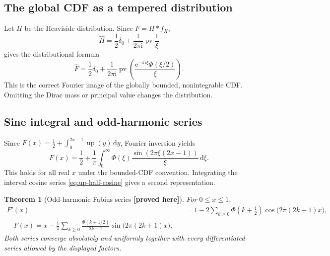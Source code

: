 \documentclass[11pt,oneside]{article}
\newtheorem{theorem}{Theorem}[section]
\theoremstyle{definition}
\theoremstyle{remark}
\newcommand{\Up}{\operatorname{up}}
\newcommand{\e}{\mathrm e}
\newcommand{\ii}{\mathrm i}
\newcommand{\dd}{\,\mathrm d}
\newcommand{\pv}{\operatorname{pv}}
\newcommand{\New}{\textcolor{amber}{\textbf{[proved here]}}}
\begin{document}
\subsection{The global CDF as a tempered distribution}

Let $H$ be the Heaviside distribution.  Since $F=H\ast f_X$,
\begin{equation}
 \widehat H=\frac12\delta_0+\frac{1}{2\pi\ii}\pv\frac1\xi
\end{equation}
gives the distributional formula
\begin{equation}
 \boxed{\quad
 \widehat F
 =\frac12\delta_0+
 \frac{1}{2\pi\ii}\pv\left(
 \frac{\e^{-\pi\ii\xi}\Phi(\xi/2)}{\xi}
 \right).
 \quad}                                                  \label{eq:F-distribution-transform}
\end{equation}
This is the correct Fourier image of the globally bounded, nonintegrable CDF.  Omitting the
Dirac mass or principal value changes the distribution.

\subsection{Sine integral and odd-harmonic series}

Since $F(x)=\tfrac12+\int_0^{2x-1}\Up(y)\dd y$, Fourier inversion yields
\begin{equation}
 \boxed{\quad
 F(x)=\frac12+\frac1\pi\int_0^\infty
 \Phi(\xi)\frac{\sin(2\pi\xi(2x-1))}{\xi}\dd\xi.
 \quad}                                                  \label{eq:F-sine-integral}
\end{equation}
This holds for all real $x$ under the bounded-CDF convention.  Integrating the interval
cosine series \eqref{eq:up-half-cosine} gives a second representation.

\begin{theorem}[Odd-harmonic Fabius series \New]
For $0\le x\le1$,
\begin{align}
 F'(x)
 &=1-2\sum_{k\ge0}\Phi\left(k+\frac12\right)
 \cos\bigl(2\pi(2k+1)x\bigr),                            \label{eq:Fprime-series}\\
 \boxed{\quad
 F(x)=x-\frac1\pi\sum_{k\ge0}
 \frac{\Phi(k+1/2)}{2k+1}
 \sin\bigl(2\pi(2k+1)x\bigr).
 \quad}                                                  \label{eq:F-sine-series}
\end{align}
Both series converge absolutely and uniformly together with every differentiated series
allowed by the displayed factors.
\end{theorem}
\end{document}
